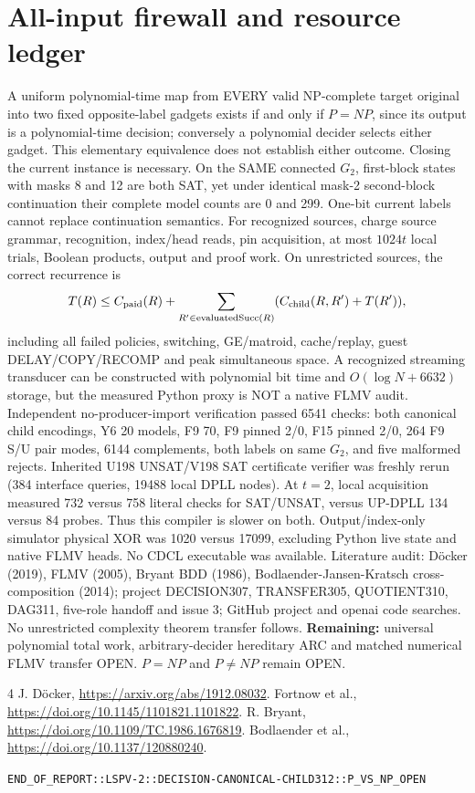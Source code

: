 \documentclass[11pt]{article}
\begin{document}
\section{All-input firewall and resource ledger}
A uniform polynomial-time map from EVERY valid NP-complete target original into two fixed opposite-label gadgets exists if and only if $P=NP$, since its output is a polynomial-time decision; conversely a polynomial decider selects either gadget. This elementary equivalence does not establish either outcome.
Closing the current instance is necessary. On the SAME connected $G_2$, first-block states with masks 8 and 12 are both SAT, yet under identical mask-2 second-block continuation their complete model counts are 0 and 299. One-bit current labels cannot replace continuation semantics.
For recognized sources, charge source grammar, recognition, index/head reads, pin acquisition, at most $1024t$ local trials, Boolean products, output and proof work. On unrestricted sources, the correct recurrence is
\[
T(R)\le C_{\mathrm{paid}}(R)+\sum_{R'\in\mathrm{evaluatedSucc}(R)}(C_{\rm child}(R,R')+T(R')),
\]
including all failed policies, switching, GE/matroid, cache/replay, guest DELAY/COPY/RECOMP and peak simultaneous space. A recognized streaming transducer can be constructed with polynomial bit time and $O(\log N+6632)$ storage, but the measured Python proxy is NOT a native FLMV audit.
Independent no-producer-import verification passed 6541 checks: both canonical child encodings, Y6 20 models, F9 70, F9 pinned 2/0, F15 pinned 2/0, 264 F9 S/U pair modes, 6144 complements, both labels on same $G_2$, and five malformed rejects. Inherited U198 UNSAT/V198 SAT certificate verifier was freshly rerun (384 interface queries, 19488 local DPLL nodes). At $t=2$, local acquisition measured 732 versus 758 literal checks for SAT/UNSAT, versus UP-DPLL 134 versus 84 probes. Thus this compiler is slower on both. Output/index-only simulator physical XOR was 1020 versus 17099, excluding Python live state and native FLMV heads. No CDCL executable was available.
Literature audit: D\"ocker (2019), FLMV (2005), Bryant BDD (1986), Bodlaender-Jansen-Kratsch cross-composition (2014); project DECISION307, TRANSFER305, QUOTIENT310, DAG311, five-role handoff and issue 3; GitHub project and openai code searches. No unrestricted complexity theorem transfer follows.
\noindent\textbf{Remaining:} universal polynomial total work, arbitrary-decider hereditary ARC and matched numerical FLMV transfer OPEN. $P=NP$ and $P\ne NP$ remain OPEN.
\begin{thebibliography}{4}
 J. D\"ocker, \url{https://arxiv.org/abs/1912.08032}.
 Fortnow et al., \url{https://doi.org/10.1145/1101821.1101822}.
 R. Bryant, \url{https://doi.org/10.1109/TC.1986.1676819}.
 Bodlaender et al., \url{https://doi.org/10.1137/120880240}.
\end{thebibliography}
\noindent\texttt{END\_OF\_REPORT::LSPV-2::DECISION-CANONICAL-CHILD312::P\_VS\_NP\_OPEN}
\end{document}
